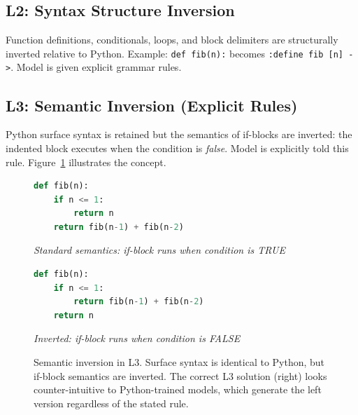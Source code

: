 \subsection{L2: Syntax Structure Inversion}
Function definitions, conditionals, loops, and block delimiters are structurally inverted relative to Python. Example: \texttt{def fib(n):} becomes \texttt{:define fib [n] ->}. Model is given explicit grammar rules.

\subsection{L3: Semantic Inversion (Explicit Rules)}
Python surface syntax is retained but the semantics of if-blocks are inverted: the indented block executes when the condition is \emph{false}. Model is explicitly told this rule. Figure~\ref{fig:semantic_inversion} illustrates the concept.

\begin{figure}[!t]
\centering
\begin{tcolorbox}[colback=gray!8, colframe=black!60,
  title=\textbf{Python (standard)}, fonttitle=\small\bfseries, boxrule=0.5pt]
\begin{lstlisting}[language=Python,
  basicstyle=\ttfamily\footnotesize,
  columns=fixed,keepspaces=true,tabsize=4]
def fib(n):
    if n <= 1:
        return n
    return fib(n-1) + fib(n-2)
\end{lstlisting}
\tcblower
\small\textit{Standard semantics: if-block runs when condition is TRUE}
\end{tcolorbox}
\vspace{3pt}
\begin{tcolorbox}[colback=gray!20, colframe=black!80,
  title=\textbf{L3 (semantic inversion)}, fonttitle=\small\bfseries, boxrule=0.5pt]
\begin{lstlisting}[language=Python,
  basicstyle=\ttfamily\footnotesize,
  columns=fixed,keepspaces=true,tabsize=4]
def fib(n):
    if n <= 1:
        return fib(n-1) + fib(n-2)
    return n
\end{lstlisting}
\tcblower
\small\textit{Inverted: if-block runs when condition is FALSE}
\end{tcolorbox}
\caption{Semantic inversion in L3. Surface syntax is identical to Python, but if-block semantics are inverted. The correct L3 solution (right) looks counter-intuitive to Python-trained models, which generate the left version regardless of the stated rule.}
\label{fig:semantic_inversion}
\end{figure}

